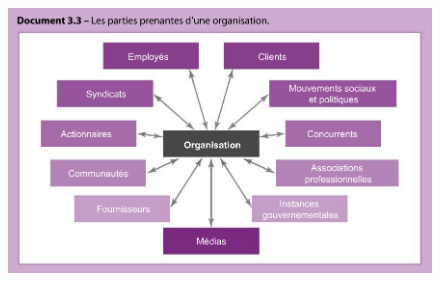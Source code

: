 \documentclass[letterpaper, 12pt]{article}
\begin{document}
		\begin{figure}[H]
			\centering
			\includegraphics[scale=0.75]{Images/environnement1}
		\end{figure}
\end{document}
